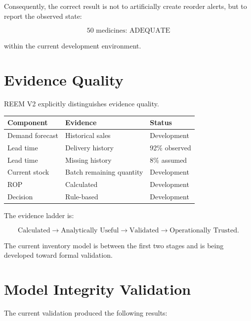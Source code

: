 \documentclass[11pt,a4paper]{article}
\begin{document}
Consequently, the correct result is not to artificially create
reorder alerts, but to report the observed state:

\[
\boxed{\text{50 medicines: ADEQUATE}}
\]

within the current development environment.

\section{Evidence Quality}

REEM V2 explicitly distinguishes evidence quality.

\begin{center}
\begin{tabular}{lll}
\toprule
\textbf{Component} & \textbf{Evidence} & \textbf{Status}\\
\midrule
Demand forecast & Historical sales & Development\\
Lead time & Delivery history & 92\% observed\\
Lead time & Missing history & 8\% assumed\\
Current stock & Batch remaining quantity & Development\\
ROP & Calculated & Development\\
Decision & Rule-based & Development\\
\bottomrule
\end{tabular}
\end{center}

The evidence ladder is:

\[
\text{Calculated}
\rightarrow
\text{Analytically Useful}
\rightarrow
\text{Validated}
\rightarrow
\text{Operationally Trusted}.
\]

The current inventory model is between the first two stages and is
being developed toward formal validation.

\section{Model Integrity Validation}

The current validation produced the following results:
\end{document}
